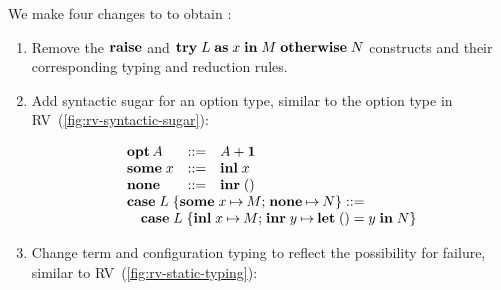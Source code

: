 \documentclass[sigplan,review,anonymous]{acmart}
\begin{document}
We make four changes to \affineEGV to obtain \affineAGV:
\begin{enumerate}
\item
  Remove the $\gvRaise$ and $\gvTry{L}{x}{M}{N}$ constructs and their corresponding typing and reduction rules.
\item
  Add syntactic sugar for an option type, similar to the option type in RV~(\cref{fig:rv-syntactic-sugar}):
  \\
  \begin{minipage}{1.0\linewidth}
    \[%
      \begin{array}{l}%
        \!\!\!%
        \begin{array}{lcl}%
          \gvTyOpt{A} &::=& \gvTySum{A}{\gvTyUnit}
          \\
          \gvSome{x} &::=& \gvInl{x}
          \\
          \gvNone &::=& \gvInr{\gvUnit}
        \end{array}
        \\
        \gvCaseOpt{L}{x}{M}{N} ::=
        \\
        \quad\gvCaseSum{L}{x}{M}{y}{\gvLetUnit{y}{N}}
      \end{array}
    \]
  \end{minipage}
\item
  Change term and configuration typing to reflect the possibility for failure, similar to RV~(\cref{fig:rv-static-typing}):
  \begin{center}
    \begin{prooftree}
    \end{prooftree}    
    \begin{prooftree}
    \end{prooftree}
    \begin{prooftree}
    \end{prooftree}
    \begin{prooftree*}

\end{prooftree*}
\end{center}
\end{enumerate}
\end{document}
